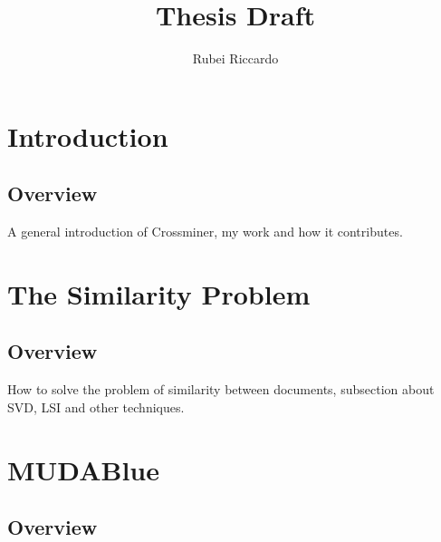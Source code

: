 \documentclass[11pt]{article} %
\title{Thesis Draft}
\author{Rubei Riccardo}
\begin{document}
\maketitle
\newpage
\tableofcontents
\newpage


















\section{Introduction}


\subsection{Overview}

A general introduction of Crossminer, my work and how it contributes.

\section{The Similarity Problem}

\subsection{Overview}

How to solve the problem of similarity between documents, subsection about SVD, LSI and other techniques.

\section{MUDABlue}

\subsection{Overview}
\end{document}
